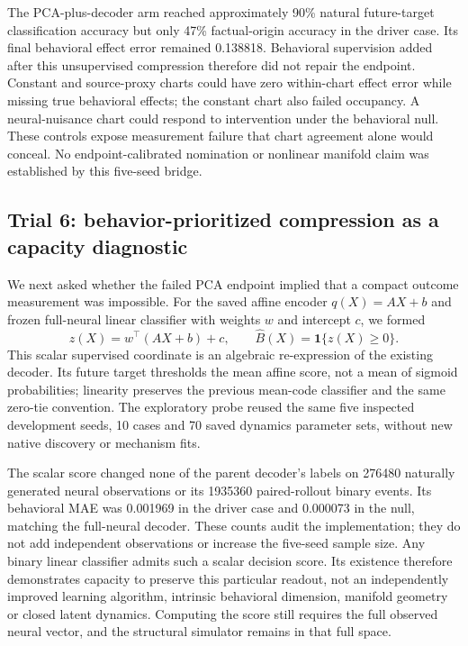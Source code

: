 The PCA-plus-decoder arm reached approximately 90\% natural future-target
classification accuracy but only 47\% factual-origin accuracy in the driver
case. Its final behavioral effect error remained 0.138818. Behavioral
supervision added after this unsupervised compression therefore did not repair
the endpoint. Constant and source-proxy charts could have zero within-chart
effect error while missing true behavioral effects; the constant chart also
failed occupancy. A neural-nuisance chart could respond to intervention under
the behavioral null. These controls expose measurement failure that chart
agreement alone would conceal. No endpoint-calibrated nomination or nonlinear
manifold claim was established by this five-seed bridge.

\subsection{Trial 6: behavior-prioritized compression as a capacity diagnostic}

We next asked whether the failed PCA endpoint implied that a compact outcome
measurement was impossible. For the saved affine encoder $q(X)=AX+b$ and frozen
full-neural linear classifier with weights $w$ and intercept $c$, we formed
\begin{equation}
 z(X)=w^{\top}(AX+b)+c,\qquad
 \widehat B(X)=\mathbf 1\{z(X)\geq0\}.
\end{equation}
This scalar supervised coordinate is an algebraic re-expression of the existing
decoder. Its future target thresholds the mean affine score, not a mean of
sigmoid probabilities; linearity preserves the previous mean-code classifier
and the same zero-tie convention. The exploratory probe reused the same five
inspected development seeds, 10 cases and 70 saved dynamics parameter sets,
without new native discovery or mechanism fits.

The scalar score changed none of the parent decoder's labels on 276480
naturally generated neural observations or its 1935360 paired-rollout binary
events. Its behavioral MAE was 0.001969 in the driver case and 0.000073 in the
null, matching the full-neural decoder. These counts audit the implementation;
they do not add independent observations or increase the five-seed sample size.
Any binary linear classifier admits such a scalar decision score. Its existence
therefore demonstrates capacity to preserve this particular readout, not an
independently improved learning algorithm, intrinsic behavioral dimension,
manifold geometry or closed latent dynamics. Computing the score still requires
the full observed neural vector, and the structural simulator remains in that
full space.

